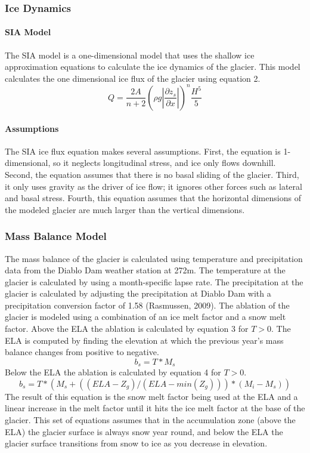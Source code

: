 \documentclass{article}
\begin{document}
\subsubsection{Ice Dynamics}
\paragraph{SIA Model}
The SIA model is a one-dimensional model that uses the shallow ice approximation equations to calculate the ice dynamics of the glacier. This model 
calculates the one dimensional ice flux of the glacier using equation 2. 
\begin{equation}Q=\frac{2A}{n+2}(\rho g|\frac{\partial z_s}{\partial x}|)^n\frac{H^5}{5}\label{tab:ice_dyn_eq}\end{equation}

\paragraph{Assumptions}
The SIA ice flux equation makes several assumptions. First, the equation is 1-dimensional, so it neglects longitudinal stress, and ice only 
flows downhill. Second, the equation assumes that there is no basal sliding of the glacier. Third, it only uses gravity as the 
driver of ice flow; it ignores other forces such as lateral and basal stress. Fourth, this equation assumes that the horizontal 
dimensions of the modeled glacier are much larger than the vertical dimensions.

\subsubsection{Mass Balance Model}
The mass balance of the glacier is calculated using temperature and precipitation data from the Diablo Dam weather station at 272m. The 
temperature at the glacier is calculated by using a month-specific lapse rate. 
The precipitation at the glacier is calculated by adjusting the precipitation at Diablo Dam with a precipitation conversion factor of 1.58 
(Rasmussen, 2009). The ablation of the glacier is modeled using a combination of an ice melt factor and a snow melt factor. Above the ELA
the ablation is calculated by equation 3 for $T>0$. The ELA is computed by finding the elevation at which the previous year's mass balance 
changes from positive to negative.
\begin{equation}b_s=T*M_{s}\label{tab:summer_mb_below_ela_eq}\end{equation}
Below the ELA the ablation is calculated by equation 4 for $T>0$.
\begin{equation}b_s=T*(M_{s}+((ELA-Z_g)/(ELA-min(Z_g)))*(M_{i}-M_{s}))\label{tab:summer_mb_above_ela_eq}\end{equation}
The result of this equation is the snow melt factor being used at the ELA and a linear increase in the melt factor until it hits the ice melt 
factor at the base of the glacier. This set of equations assumes that in the accumulation zone (above the ELA) the glacier surface is always snow year 
round, and below the ELA the glacier surface transitions from snow to ice as you decrease in elevation.
\end{document}
